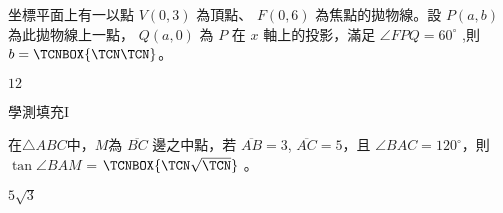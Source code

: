 \begin{QUESTIONS}
\begin{QUESTION}
        \begin{ExamAnsRateInfo}{32}{63}{26}{7}
        \end{ExamAnsRateInfo}
        \begin{QBODY}
            坐標平面上有一以點 $V(0, 3)$ 為頂點、 $F(0, 6)$ 為焦點的拋物線。設 $P(a, b)$ 為此拋物線上一點， $Q(a,0)$ 為 $P$ 在 $x$ 軸上的投影，滿足 $\angle FPQ=60^\circ$ ,則 $b= \TCNBOX{\TCN\TCN}$。
        \end{QBODY}
        \begin{QFROMS}
        \end{QFROMS}
        \begin{QTAGS}\end{QTAGS}
        \begin{QANS}
            $12$
        \end{QANS}
        \begin{QSOLLIST}
        \end{QSOLLIST}
        \begin{QEMPTYSPACE}
        \end{QEMPTYSPACE}
    \end{QUESTION}
    \begin{QUESTION}
        \begin{ExamInfo}{96}{學測}{填充}{I}
        \end{ExamInfo}
        \begin{ExamAnsRateInfo}{15}{37}{6}{2}
        \end{ExamAnsRateInfo}
        \begin{QBODY}
            在$\triangle ABC$中，$M$為 $\overline{BC}$ 邊之中點，若 $\overline{AB}=3$, $\overline{AC}=5$，且 $\angle BAC=120^\circ$，則 $\tan \angle BAM$ = 
	$\TCNBOX{\TCN\sqrt{\TCN}}$ 。
        \end{QBODY}
        \begin{QFROMS}
        \end{QFROMS}
        \begin{QTAGS}\end{QTAGS}
        \begin{QANS}
            $5 \sqrt{3}$
        \end{QANS}
        \begin{QSOLLIST}
        \end{QSOLLIST}
        \begin{QEMPTYSPACE}
        \end{QEMPTYSPACE}
    \end{QUESTION}
\end{QUESTIONS}
